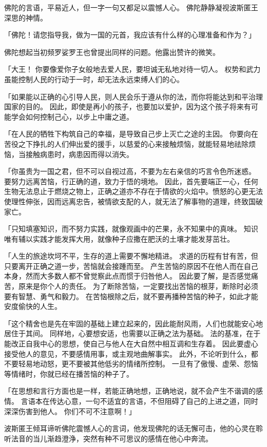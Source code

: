 \documentclass[twoside,openany]{book}
\begin{document}
佛陀的言语，平易近人，但一字一句又都足以震憾人心。
佛陀静静凝视波斯匿王深思的神情。

「佛陀！请您指导我，做为一国的元首，我应该有什么样的心理准备和作为？」

佛陀想起当初频罗娑罗王也曾提出同样的问题。他露出赞许的微笑。

「大王！
你要像爱你子女般地去爱人民，要坦诚无私地对待一切人。
权势和武力虽能控制人民的行动于一时，却无法永远束缚人们的心。

「如果能以正确的心引导人民，则人民会乐于遵从你的法，而你将能达到和平治理国家的目的。
因此，即使是再小的孩子，也要加以爱护，因为这个孩子将来有可能学会如何控制己心，以步上中庸之道。

「在人民的牺牲下构筑自己的幸福，是导致自己步上灭亡之途的主因。
你要向在苦役之下挣扎的人们伸出爱的援手，以慈爱的心来接触烦恼，就能轻易地祛除烦恼，当接触病患时，病患因而得以消失。

「你虽贵为一国之君，但不可以自视过高，不要为左右亲信的巧言令色所迷惑。
要努力远离苦恼，行正确的道，致力于悟的境地。
因此，首先要端正一心，任何生物无法息止于燃烧之物上，正确之道亦不存在于情欲的火焰中。愤怒的心更无法使理性伸张，因而远离忠告，被情欲支配的人，就无法了解事物的道理，终致国破家亡。

「只知填塞知识，而不努力实践，就像观画中的芒果，永不知果中的真味。
知识唯有辅以实践才能发挥大用，就像种子应撒在肥沃的土壤才能发芽茁壮。

「人生的旅途坎坷不平，生存的道上需要不懈地精进。
求道的历程有甘有苦，但只要离开正确之道一步，苦恼就会接踵而至。
产生苦恼的原因不在他人而在自己本身，然而大多数人都不曾觉察此点而惯于归咎他人。
因此要了解，是否感觉痛苦，原来是你个人的责任。
为了断除苦恼，一定要找出苦恼的根芽，断除时必须要有智慧、勇气和毅力。
在苦恼根除之后，就不要再播种苦恼的种子，如此才能安度偷快的人生。

「这个精舍也是先在牢固的基础上建立起来的，因此能耐风雨，人们也就能安心地居住于其间。
同样地，心要想安适，也需要以正确之法为基础。
法的基准，在于能改正自我中心的思想，使自己与他人在大自然中相互调和生存着。
因此要虚心接受他人的意见，不要感情用事，或主观地曲解事实。
此外，不论听到什么，都不要轻易地动怒，更不要被其他低劣的情绪所控制。
一旦有了傲慢、虚荣、怨恼等情绪时，你就已经在播苦恼的种子了。

「在思想和言行方面也是一样，若能正确地想，正确地说，就不会产生不谐调的感情。
言语本在传达心意，一句不适宜的言语，不但阻碍了自己的上进之道，同时深深伤害到他人。
你们不可不注意啊！」

波斯匿王倾耳谛听佛陀震憾人心的言词，他发现佛陀的话无懈可击，他的心灵在聆听法音的当儿渐趋澄浄，突然有种不可思议的感情在他心中奔流。
\end{document}

